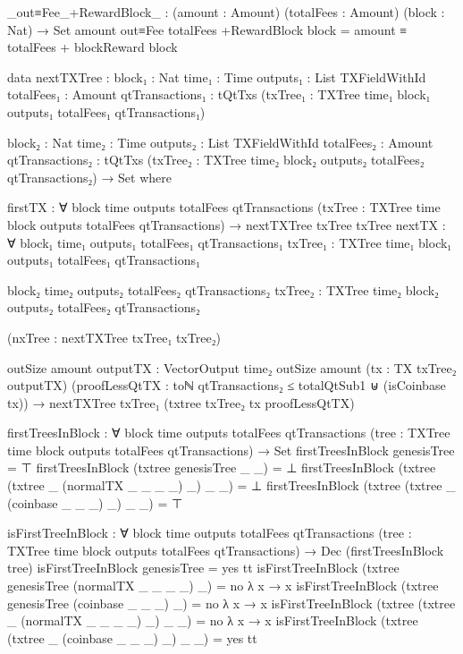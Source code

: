 \documentclass{beamer}
\begin{document}
\begin{code}
        _out≡Fee_+RewardBlock_ : (amount : Amount)
          (totalFees : Amount)
          (block : Nat) → Set
        amount out≡Fee totalFees +RewardBlock block =
          amount ≡ totalFees + blockReward block


      data nextTXTree :
        {block₁ : Nat}
        {time₁ : Time}
        {outputs₁ : List TXFieldWithId}
        {totalFees₁ : Amount}
        {qtTransactions₁ : tQtTxs}
        (txTree₁ : TXTree time₁ block₁ outputs₁ totalFees₁ qtTransactions₁)

        {block₂ : Nat}
        {time₂ : Time}
        {outputs₂ : List TXFieldWithId}
        {totalFees₂ : Amount}
        {qtTransactions₂ : tQtTxs}
        (txTree₂ : TXTree time₂ block₂ outputs₂ totalFees₂ qtTransactions₂)
        → Set where

        firstTX : ∀ {block time outputs totalFees qtTransactions}
          (txTree : TXTree time block outputs totalFees qtTransactions)
          → nextTXTree txTree txTree
        nextTX : ∀ {block₁ time₁ outputs₁ totalFees₁ qtTransactions₁}
          {txTree₁ : TXTree time₁ block₁ outputs₁ totalFees₁ qtTransactions₁}

          {block₂ time₂ outputs₂ totalFees₂ qtTransactions₂}
          {txTree₂ : TXTree time₂ block₂ outputs₂ totalFees₂ qtTransactions₂}

          (nxTree : nextTXTree txTree₁ txTree₂)

          {outSize amount}
          {outputTX : VectorOutput time₂ outSize amount}
          (tx : TX txTree₂ outputTX)
          (proofLessQtTX :
              toℕ qtTransactions₂ ≤ totalQtSub1
              ⊎
              (isCoinbase tx))
          → nextTXTree txTree₁ (txtree txTree₂ tx proofLessQtTX)

      firstTreesInBlock : ∀
        {block time outputs totalFees qtTransactions}
        (tree : TXTree time block outputs totalFees qtTransactions)
        → Set
      firstTreesInBlock genesisTree = ⊤
      firstTreesInBlock (txtree genesisTree _ _) = ⊥
      firstTreesInBlock (txtree (txtree _ (normalTX _ _ _ _) _) _ _) = ⊥
      firstTreesInBlock (txtree (txtree _ (coinbase _ _ _) _) _ _) = ⊤

      isFirstTreeInBlock : ∀
        {block time outputs totalFees qtTransactions}
        (tree : TXTree time block outputs totalFees qtTransactions)
        → Dec (firstTreesInBlock tree)
      isFirstTreeInBlock genesisTree = yes tt
      isFirstTreeInBlock (txtree genesisTree (normalTX _ _ _ _) _) = no λ x → x
      isFirstTreeInBlock (txtree genesisTree (coinbase _ _ _) _) = no λ x → x
      isFirstTreeInBlock (txtree (txtree _ (normalTX _ _ _ _) _) _ _) = no λ x → x
      isFirstTreeInBlock (txtree (txtree _ (coinbase _ _ _) _) _ _) = yes tt


\end{code}
\end{document}
